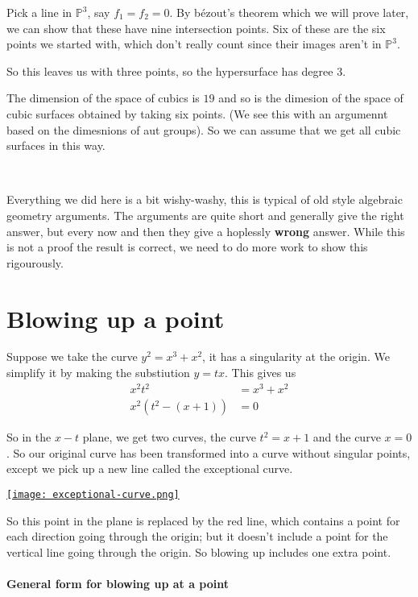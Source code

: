 Pick a line in $\mathbb{P}^3$, say $f_1=f_2=0$. By bézout's theorem which we will prove later, we can show that these have nine intersection points. Six of these are the six points we started with, which don't really count since their images aren't in $\mathbb{P}^3$.

So this leaves us with three points, so the hypersurface has degree $3$. 

The dimension of the space of cubics is $19$ and so is the dimesion of the space of cubic surfaces obtained by taking six points. (We see this with an argumennt based on the dimesnions of aut groups). So we can assume that we get all cubic surfaces in this way.

\

Everything we did here is a bit wishy-washy, this is typical of old style algebraic geometry arguments. The arguments are quite short and generally give the right answer, but every now and then they give a hoplessly \textbf{wrong} answer. While this is not a proof the result is correct, we need to do more work to show this rigourously.

\section{Blowing up a point}
Suppose we take the curve $y^2 = x^3+x^2$, it has a singularity at the origin. We simplify it by making the substiution $y = tx$. This gives us\begin{align*}
    x^2t^2 &= x^3+x^2\\
    x^2(t^2-(x+1)) &= 0
\end{align*}


So in the $x-t$ plane, we get two curves, the curve $t^2 = x+1$ and the curve $x=0$. So our original curve has been transformed into a curve without singular points, except we pick up a new line called the exceptional curve.

\href{https://youtu.be/dGnfONlZwhQ?t=118}{\texttt{[image: exceptional-curve.png]}}

So this point in the plane is replaced by the red line, which contains a point for each direction going through the origin; but it doesn't include a point for the vertical line going through the origin. So blowing up includes one extra point.

\paragraph*{General form for blowing up at a point}

